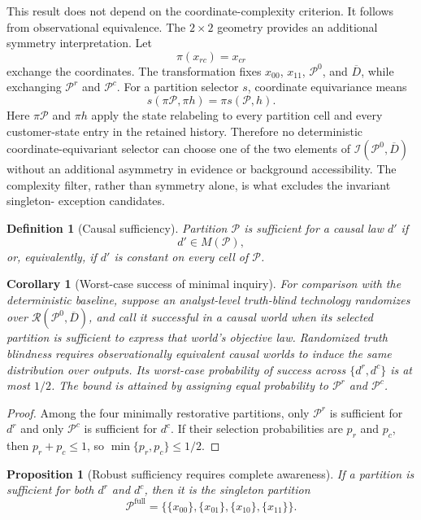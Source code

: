 \documentclass[11pt]{article}
\newtheorem{definition}[assumption]{Definition}
\newtheorem{proposition}[assumption]{Proposition}
\newtheorem{corollary}[assumption]{Corollary}
\newcommand{\Prow}{\mathcal P^{r}}
\newcommand{\Pcol}{\mathcal P^{c}}
\newcommand{\Pfull}{\mathcal P^{\mathrm{full}}}
\begin{document}
This result does not depend on the coordinate-complexity criterion.  It follows
from observational equivalence.  The $2\times2$ geometry provides an additional
symmetry interpretation.  Let
\[
\pi(x_{rc})=x_{cr}
\]
exchange the coordinates.  The transformation fixes $x_{00}$, $x_{11}$,
$\mathcal P^0$, and $\overline D$, while exchanging $\Prow$ and $\Pcol$.
For a partition selector $s$, coordinate equivariance means
\[
s(\pi\mathcal P,\pi h)=\pi s(\mathcal P,h).
\]
Here $\pi\mathcal P$ and $\pi h$ apply the state relabeling to every partition
cell and every customer-state entry in the retained history.
Therefore no deterministic coordinate-equivariant selector can choose one of
the two elements of $\mathcal I(\mathcal P^0,\overline D)$ without an
additional asymmetry in evidence or background accessibility.  The complexity
filter, rather than symmetry alone, is what excludes the invariant singleton-
exception candidates.

\begin{definition}[Causal sufficiency]
Partition $\mathcal P$ is sufficient for a causal law $d'$ if
\[
d'\in M(\mathcal P),
\]
or, equivalently, if $d'$ is constant on every cell of $\mathcal P$.
\end{definition}

\begin{corollary}[Worst-case success of minimal inquiry]
\label{cor:maximin}
For comparison with the deterministic baseline, suppose an analyst-level
truth-blind technology randomizes over
$\mathcal R(\mathcal P^0,\overline D)$, and call it successful in a causal world
when its selected partition is sufficient to express that world's objective
law.  Randomized truth blindness requires observationally equivalent causal
worlds to induce the same distribution over outputs.  Its worst-case
probability of success across $\{d^r,d^c\}$ is at most
$1/2$.  The bound is attained by assigning equal probability to $\Prow$ and
$\Pcol$.
\end{corollary}

\begin{proof}
Among the four minimally restorative partitions, only $\Prow$ is sufficient
for $d^r$ and only $\Pcol$ is sufficient for $d^c$.  If their selection
probabilities are $p_r$ and $p_c$, then $p_r+p_c\leq1$, so
$\min\{p_r,p_c\}\leq1/2$.
\end{proof}

\begin{proposition}[Robust sufficiency requires complete awareness]
\label{prop:robust-awareness}
If a partition is sufficient for both $d^r$ and $d^c$, then it is the singleton
partition
\begin{equation}
\Pfull
=
\big\{
\{x_{00}\},\{x_{01}\},\{x_{10}\},\{x_{11}\}
\big\}.
\label{eq:full-partition}
\end{equation}
\end{proposition}
\end{document}
